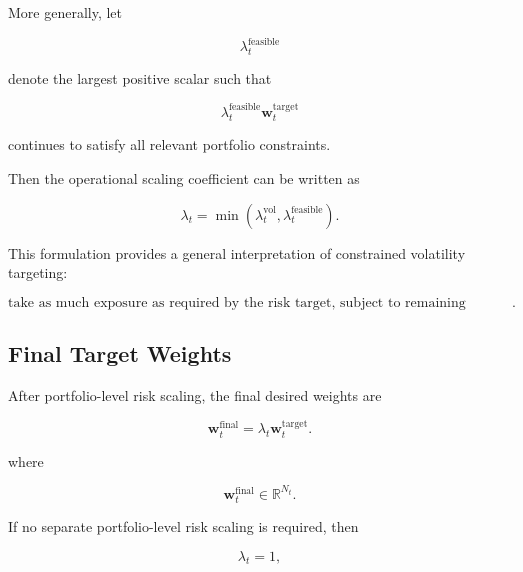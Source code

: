 \documentclass[11pt,a4paper]{article}
\begin{document}
More generally, let

\begin{equation}
\lambda_t^{\mathrm{feasible}}
\end{equation}

denote the largest positive scalar such that

\begin{equation}
\lambda_t^{\mathrm{feasible}}
\mathbf{w}_t^{\mathrm{target}}
\end{equation}

continues to satisfy all relevant portfolio constraints.

Then the operational scaling coefficient can be written as

\begin{equation}
\boxed{
\lambda_t
=
\min
\left(
\lambda_t^{\mathrm{vol}},
\lambda_t^{\mathrm{feasible}}
\right).
}
\end{equation}

This formulation provides a general interpretation of constrained volatility
targeting:

\begin{equation}
\boxed{
\text{take as much exposure as required by the risk target,
subject to remaining feasible}.
}
\end{equation}


\subsection{Final Target Weights}
\label{subsec:final_target_weights}

After portfolio-level risk scaling, the final desired weights are

\begin{equation}
\boxed{
\mathbf{w}_t^{\mathrm{final}}
=
\lambda_t
\mathbf{w}_t^{\mathrm{target}}.
}
\end{equation}

where

\begin{equation}
\mathbf{w}_t^{\mathrm{final}}
\in
\mathbb{R}^{N_t}.
\end{equation}

If no separate portfolio-level risk scaling is required, then

\begin{equation}
\lambda_t=1,
\end{equation}
\end{document}
